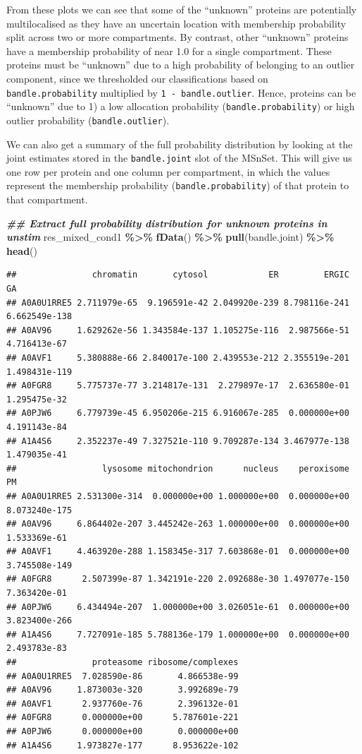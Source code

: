 \documentclass[9pt,a4paper,]{extarticle}
\newenvironment{Shaded}{\begin{snugshade}}{\end{snugshade}}
\newcommand{\DocumentationTok}[1]{\textcolor[rgb]{0.56,0.35,0.01}{\textbf{\textit{#1}}}}
\newcommand{\FunctionTok}[1]{\textcolor[rgb]{0.13,0.29,0.53}{\textbf{#1}}}
\newcommand{\NormalTok}[1]{#1}
\newcommand{\SpecialCharTok}[1]{\textcolor[rgb]{0.81,0.36,0.00}{\textbf{#1}}}
\begin{document}
From these plots we can see that some of the ``unknown'' proteins are potentially
multilocalised as they have an uncertain location with membership probability
split across two or more compartments. By contrast, other ``unknown'' proteins
have a membership probability of near 1.0 for a single compartment. These
proteins must be ``unknown'' due to a high probability of belonging to an
outlier component, since we thresholded our classifications based on
\texttt{bandle.probability} multiplied by \texttt{1\ -\ bandle.outlier}. Hence, proteins can be
``unknown'' due to 1) a low allocation probability (\texttt{bandle.probability}) or
high outlier probability (\texttt{bandle.outlier}).

We can also get a summary of the full probability distribution by looking at the
joint estimates stored in the \texttt{bandle.joint} slot of the MSnSet. This will give
us one row per protein and one column per compartment, in which the values
represent the membership probability (\texttt{bandle.probability}) of that protein to
that compartment.

\begin{Shaded}
\begin{Highlighting}[]
\DocumentationTok{\#\# Extract full probability distribution for unknown proteins in unstim}
\NormalTok{res\_mixed\_cond1 }\SpecialCharTok{\%\textgreater{}\%}
  \FunctionTok{fData}\NormalTok{() }\SpecialCharTok{\%\textgreater{}\%}
  \FunctionTok{pull}\NormalTok{(bandle.joint) }\SpecialCharTok{\%\textgreater{}\%}
  \FunctionTok{head}\NormalTok{()}
\end{Highlighting}
\end{Shaded}

\begin{verbatim}
##               chromatin       cytosol            ER         ERGIC            GA
## A0A0U1RRE5 2.711979e-65  9.196591e-42 2.049920e-239 8.798116e-241 6.662549e-138
## A0AV96     1.629262e-56 1.343584e-137 1.105275e-116  2.987566e-51  4.716413e-67
## A0AVF1     5.380888e-66 2.840017e-100 2.439553e-212 2.355519e-201 1.498431e-119
## A0FGR8     5.775737e-77 3.214817e-131  2.279897e-17  2.636580e-01  1.295475e-32
## A0PJW6     6.779739e-45 6.950206e-215 6.916067e-285  0.000000e+00  4.191143e-84
## A1A4S6     2.352237e-49 7.327521e-110 9.709287e-134 3.467977e-138  1.479035e-41
##                 lysosome mitochondrion      nucleus    peroxisome            PM
## A0A0U1RRE5 2.531300e-314  0.000000e+00 1.000000e+00  0.000000e+00 8.073240e-175
## A0AV96     6.864402e-207 3.445242e-263 1.000000e+00  0.000000e+00  1.533369e-61
## A0AVF1     4.463920e-288 1.158345e-317 7.603868e-01  0.000000e+00 3.745508e-149
## A0FGR8      2.507399e-87 1.342191e-220 2.092688e-30 1.497077e-150  7.363420e-01
## A0PJW6     6.434494e-207  1.000000e+00 3.026051e-61  0.000000e+00 3.823400e-266
## A1A4S6     7.727091e-185 5.788136e-179 1.000000e+00  0.000000e+00  2.493783e-83
##               proteasome ribosome/complexes
## A0A0U1RRE5  7.028590e-86       4.866538e-99
## A0AV96     1.873003e-320       3.992689e-79
## A0AVF1      2.937760e-76       2.396132e-01
## A0FGR8      0.000000e+00      5.787601e-221
## A0PJW6      0.000000e+00       0.000000e+00
## A1A4S6     1.973827e-177      8.953622e-102
\end{verbatim}
\end{document}
